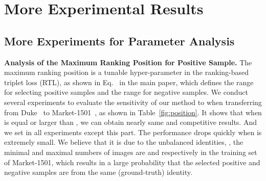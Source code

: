 \documentclass[10pt,twocolumn,letterpaper]{article}
\begin{document}
\section{More Experimental Results}
\subsection{More Experiments for Parameter Analysis}
\textbf{Analysis of the Maximum Ranking Position  for Positive Sample.}
The maximum ranking position  is a tunable hyper-parameter in the ranking-based triplet loss (RTL), as shown in Eq.~ in the main paper, which defines the range  for selecting positive samples and the range  for negative samples. 
We conduct several experiments to evaluate the sensitivity of our method to  when transferring from Duke~\cite{duke} to Market-1501~\cite{market1501}, as shown in Table~\ref{fig:position}. 
It shows that when  is equal or larger than , we can obtain nearly same and competitive results. 
And we set  in all experiments except this part. The performance drops quickly when  is extremely small. 
We believe that it is due to the unbalanced identities, \eg, the minimal and maximal numbers of images are  and  respectively in the training set of Market-1501, which results in a large probability that the selected positive and negative samples are from the same (ground-truth) identity.
\end{document}
